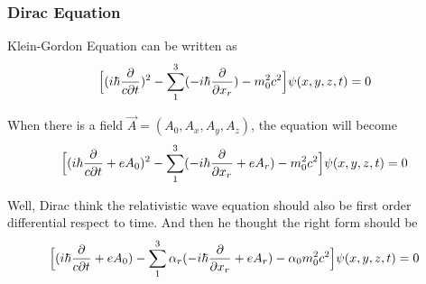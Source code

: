 \subsubsection{Dirac Equation}

Klein-Gordon Equation can be written as 
\begin{align*}
	\Big[ (i\hbar\frac{\partial}{c \partial t} )^2-\sum_1^3 (-i\hbar \frac{\partial}{\partial x_r} )-m_0^2c^2  \Big]\psi(x,y,z,t)=0
\end{align*}

When there is a field $\vec{A}=(A_0,A_x,A_y,A_z)$, the equation will become 
\begin{align*}
	\Big[ (i\hbar\frac{\partial}{c \partial t} +eA_0)^2-\sum_1^3 (-i\hbar \frac{\partial}{\partial x_r} +eA_r)-m_0^2c^2  \Big]\psi(x,y,z,t)=0
\end{align*}

Well, Dirac think the relativistic wave equation should also be first order differential respect to time. And then he thought the right form should be 
\begin{align*}
	\Big[ (i\hbar\frac{\partial}{c \partial t} +eA_0)-\sum_1^3 \alpha_r(-i\hbar \frac{\partial}{\partial x_r} +eA_r)-\alpha_0m_0^2c^2  \Big]\psi(x,y,z,t)=0
\end{align*}





